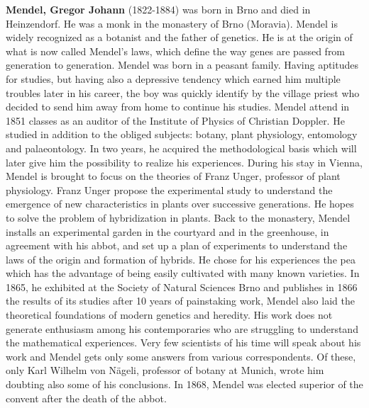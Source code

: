 \textbf{Mendel, Gregor Johann} (1822-1884) was born in Brno and died in Heinzendorf. He was a monk in the monastery of Brno (Moravia). Mendel is widely recognized as a botanist and the father of genetics. He is at the origin of what is now called Mendel's laws, which define the way genes are passed from generation to generation. Mendel was born in a peasant family. Having aptitudes for studies, but having also a depressive tendency which earned him multiple troubles later in his career, the boy was quickly identify by the village priest who decided to send him away from home to continue his studies. Mendel attend in 1851 classes as an auditor of the Institute of Physics of Christian Doppler. He studied in addition to the obliged subjects: botany, plant physiology, entomology and palaeontology. In two years, he acquired the methodological basis which will later give him the possibility to realize his experiences. During his stay in Vienna, Mendel is brought to focus on the theories of Franz Unger, professor of plant physiology. Franz Unger propose the experimental study to understand the emergence of new characteristics in plants over successive generations. He hopes to solve the problem of hybridization in plants. Back to the monastery, Mendel installs an experimental garden in the courtyard and in the greenhouse, in agreement with his abbot, and set up a plan of experiments to understand the laws of the origin and formation of hybrids. He chose for his experiences the pea which has the advantage of being easily cultivated with many known varieties. In 1865, he exhibited at the Society of Natural Sciences Brno and publishes in 1866 the results of its studies after 10 years of painstaking work, Mendel also laid the theoretical foundations of modern genetics and heredity. His work does not generate enthusiasm among his contemporaries who are struggling to understand the mathematical experiences. Very few scientists of his time will speak about his work and Mendel gets only some answers from various correspondents. Of these, only Karl Wilhelm von Nägeli, professor of botany at Munich, wrote him doubting also some of his conclusions. In 1868, Mendel was elected superior of the convent after the death of the abbot.

